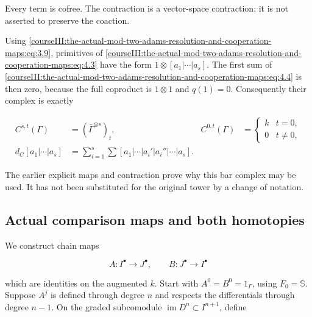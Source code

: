 Every term is cofree. The contraction is a vector-space contraction; it is not asserted to preserve the coaction.

Using \eqref{courseIII:the-actual-mod-two-adams-resolution-and-cooperation-maps:eq:3.9}, primitives of \eqref{courseIII:the-actual-mod-two-adams-resolution-and-cooperation-maps:eq:4.3} have the form \(1\otimes[a_1|\cdots|a_s]\). The first sum of \eqref{courseIII:the-actual-mod-two-adams-resolution-and-cooperation-maps:eq:4.4} is then zero, because the full coproduct is \(1\otimes1\) and \(q(1)=0\). Consequently their complex is exactly

\begin{equation}
\begin{aligned}
 C^{s,t}(\Gamma)&=(\bar\Gamma^{\otimes s})_t,
        &C^{0,t}(\Gamma)&=\begin{cases}k&t=0,\\0&t\ne0,\end{cases}\\
 d_C[a_1|\cdots|a_s]
   &=\sum_{i=1}^s\sum[a_1|\cdots|a_i'|a_i''|\cdots|a_s].
 \end{aligned}
 \label{courseIII:the-actual-mod-two-adams-resolution-and-cooperation-maps:eq:4.9}
\end{equation}

The earlier explicit maps and contraction prove why this bar complex may be used. It has not been substituted for the original tower by a change of notation.

\subsection{Actual comparison maps and both homotopies}
\label{courseIII:the-actual-mod-two-adams-resolution-and-cooperation-maps:cooperation-chain-comparison}

\label{courseIII:the-actual-mod-two-adams-resolution-and-cooperation-maps:section-5}\label{courseIII:actual-resolution:5}

We construct chain maps

\begin{equation}
A:I^\bullet\longrightarrow J^\bullet,
 \qquad B:J^\bullet\longrightarrow I^\bullet
 \label{courseIII:the-actual-mod-two-adams-resolution-and-cooperation-maps:eq:5.1}
\end{equation}

which are identities on the augmented \(k\). Start with \(A^0=B^0=1_\Gamma\), using \(F_0=\mathbb S\). Suppose \(A^j\) is defined through degree \(n\) and respects the differentials through degree \(n-1\). On the graded subcomodule \(\operatorname{im}D^n\subset I^{n+1}\), define

